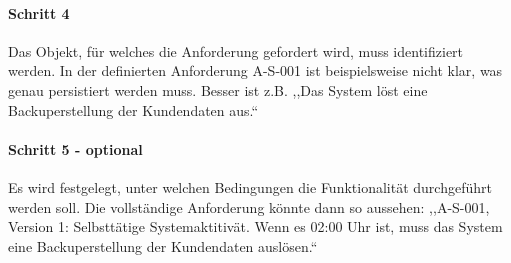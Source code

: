 \paragraph{Schritt 4}
Das Objekt, für welches die Anforderung gefordert wird, muss identifiziert werden. In der definierten Anforderung A-S-001 ist beispielsweise nicht klar, was genau persistiert werden muss.
Besser ist z.B. ,,Das System löst eine Backuperstellung der Kundendaten aus.``

\paragraph{Schritt 5 - optional}
Es wird festgelegt, unter welchen Bedingungen die Funktionalität durchgeführt werden soll. Die vollständige Anforderung könnte dann so aussehen:
,,A-S-001, Version 1: Selbsttätige Systemaktitivät. Wenn es 02:00 Uhr ist, muss das System eine Backuperstellung der Kundendaten auslösen.``

